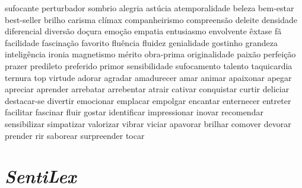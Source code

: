 sufocante perturbador sombrio alegria ast\'{u}cia atemporalidade beleza bem-estar best-seller brilho carisma cl\'{i}max companheirismo compreens\~ao deleite densidade diferencial divers\~ao do\c{c}ura emo\c{c}\~ao empatia entusiasmo envolvente \^{e}xtase f\~a facilidade fascina\c{c}\~ao favorito flu\^{e}ncia fluidez genialidade gostinho grandeza intelig\^{e}ncia ironia magnetismo m\'{e}rito obra-prima originalidade paix\~ao perfei\c{c}\~ao prazer predileto preferido primor sensibilidade sufocamento talento taquicardia ternura top virtude adorar agradar amadurecer amar animar apaixonar apegar apreciar aprender arrebatar arrebentar atrair cativar conquistar curtir deliciar destacar-se divertir emocionar emplacar empolgar encantar enternecer entreter facilitar fascinar fluir gostar identificar impressionar inovar recomendar sensibilizar simpatizar valorizar vibrar viciar apavorar brilhar comover devorar prender rir saborear surpreender tocar

\section{\textit{SentiLex}}
